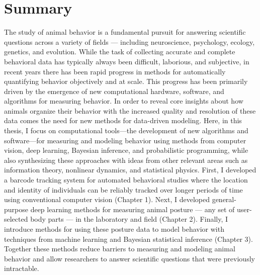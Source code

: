 	\chapter*{Summary}
  The study of animal behavior is a fundamental pursuit for answering scientific questions across a variety of fields --- including neuroscience, psychology, ecology, genetics, and evolution. While the task of collecting accurate and complete behavioral data has typically always been difficult, laborious, and subjective, in recent years there has been rapid progress in methods for automatically quantifying behavior objectively and at scale. This progress has been primarily driven by the emergence of new computational hardware, software, and algorithms for measuring behavior. In order to reveal core insights about how animals organize their behavior with the increased quality and resolution of these data comes the need for new methods for data-driven modeling. Here, in this thesis, I focus on computational tools—the development of new algorithms and software—for measuring and modeling behavior using methods from computer vision, deep learning, Bayesian inference, and probabilistic programming, while also synthesizing these approaches with ideas from other relevant areas such as information theory, nonlinear dynamics, and statistical physics. First, I developed a barcode tracking system for automated behavioral studies where the location and identity of individuals can be reliably tracked over longer periods of time using conventional computer vision (Chapter 1). Next, I developed general-purpose deep learning methods for measuring animal posture --- any set of user-selected body parts --- in the laboratory and field (Chapter 2). Finally, I introduce methods for using these posture data to model behavior with techniques from machine learning and Bayesian statistical inference (Chapter 3). Together these methods reduce barriers to measuring and modeling animal behavior and allow researchers to answer scientific questions that were previously intractable.

